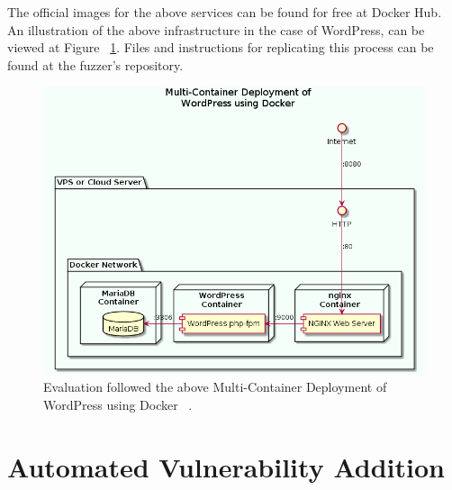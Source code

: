 The official images for the above services can be found for free at Docker Hub. An illustration of the above infrastructure in the case of WordPress, can be viewed at Figure ~\ref{fig:multi-container}. Files and instructions for replicating this process can be found at the fuzzer's repository.

\begin{figure}[ht]
 \centering
 \captionsetup{justification=centering}
 \includegraphics[width=5in]{figures/multi-container.png}
 \caption{Evaluation followed the above Multi-Container Deployment of WordPress using Docker ~\cite{multi-container}.}
 \label{fig:multi-container}
\end{figure}

\section{Automated Vulnerability Addition}
